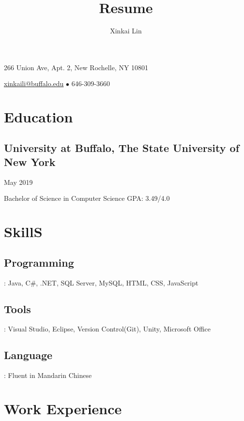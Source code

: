 \documentclass[11pt, letterpaper]{article} %
\makeatletter
\renewcommand{\maketitle}{
\begin{center}
{\Huge\bfseries
\theauthor}

266 Union Ave, Apt. 2, New Rochelle, NY 10801

\href{mailto:xinkaili@buffalo.edu}{xinkaili@buffalo.edu} $\bullet$ 646-309-3660

\end{center}
}
\makeatother
\begin{document}
\title{Resume} 
\author{Xinkai Lin}

\maketitle

\section{Education}
\subsection{University at Buffalo, The State University of New York}
\hspace*{\fill}May 2019

\noindent Bachelor of Science in Computer Science 
\hspace*{\fill}GPA: 3.49/4.0\\

\section{SkillS}
\subsection{Programming}
: Java, C\#, .NET, SQL Server, MySQL, HTML, CSS, JavaScript

\subsection{Tools}
: Visual Studio, Eclipse, Version Control(Git), Unity, Microsoft Office

\subsection{Language}
: Fluent in Mandarin Chinese\\

\section{Work Experience}
\end{document}
